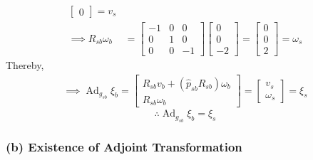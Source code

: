 \begin{align*}
\begin{bmatrix}
        0
    \end{bmatrix}
    =
    v_s
    \\
    \implies
    R_{s b} \omega_b
     & =
    \begin{bmatrix}
        -1 & 0 & 0  \\
        0  & 1 & 0  \\
        0  & 0 & -1
    \end{bmatrix}
    \begin{bmatrix}
        0 \\
        0 \\
        -2
    \end{bmatrix}
    =
    \begin{bmatrix}
        0 \\
        0 \\
        2
    \end{bmatrix}
    =
    \omega_s
\end{align*}
Thereby,
\begin{align*}
    \implies
    \operatorname{Ad}_{g_{s b}} \xi_{b}
    =
    \begin{bmatrix}
        R_{s b} v_b + (\widehat{p}_{s b} R_{s b}) \omega_b \\
        R_{s b} \omega_b
    \end{bmatrix}
    =
    \begin{bmatrix}
        v_s \\
        \omega_s
    \end{bmatrix}
    =
    \xi_s
\end{align*}
\begin{equation*}
    \therefore
    \boxed{
    \operatorname{Ad}_{g_{s b}} \xi_{b}
    =
    \xi_s
    }
\end{equation*}

\subsubsection*{(b) Existence of Adjoint Transformation}

